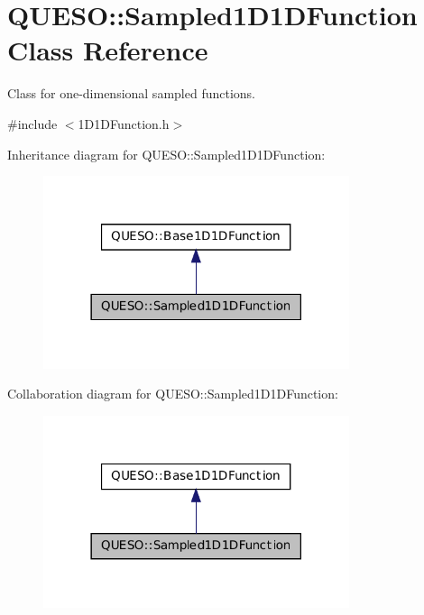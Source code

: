 \hypertarget{class_q_u_e_s_o_1_1_sampled1_d1_d_function}{\section{Q\-U\-E\-S\-O\-:\-:Sampled1\-D1\-D\-Function Class Reference}
\label{class_q_u_e_s_o_1_1_sampled1_d1_d_function}
}


Class for one-\/dimensional sampled functions.  




{\ttfamily \#include $<$1\-D1\-D\-Function.\-h$>$}



Inheritance diagram for Q\-U\-E\-S\-O\-:\-:Sampled1\-D1\-D\-Function\-:
\nopagebreak
\begin{figure}[H]
\begin{center}
\leavevmode
\includegraphics[width=254pt]{class_q_u_e_s_o_1_1_sampled1_d1_d_function__inherit__graph}
\end{center}
\end{figure}


Collaboration diagram for Q\-U\-E\-S\-O\-:\-:Sampled1\-D1\-D\-Function\-:
\nopagebreak
\begin{figure}[H]
\begin{center}
\leavevmode
\includegraphics[width=254pt]{class_q_u_e_s_o_1_1_sampled1_d1_d_function__coll__graph}
\end{center}
\end{figure}
